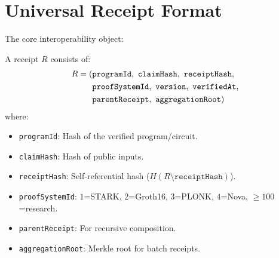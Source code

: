 \section{Universal Receipt Format}


The core interoperability object:

\begin{definition}
A receipt $R$ consists of:
\begin{align}
R = (&\texttt{programId},\ \texttt{claimHash},\ \texttt{receiptHash}, \notag \\
     &\texttt{proofSystemId},\ \texttt{version},\ \texttt{verifiedAt}, \notag \\
     &\texttt{parentReceipt},\ \texttt{aggregationRoot}) \notag
\end{align}
where:
\begin{itemize}
\item \texttt{programId}: Hash of the verified program/circuit.
\item \texttt{claimHash}: Hash of public inputs.
\item \texttt{receiptHash}: Self-referential hash ($H(R \setminus \texttt{receiptHash})$).
\item \texttt{proofSystemId}: $1$=STARK, $2$=Groth16, $3$=PLONK, $4$=Nova, $\geq 100$=research.
\item \texttt{parentReceipt}: For recursive composition.
\item \texttt{aggregationRoot}: Merkle root for batch receipts.
\end{itemize}
\end{definition}

